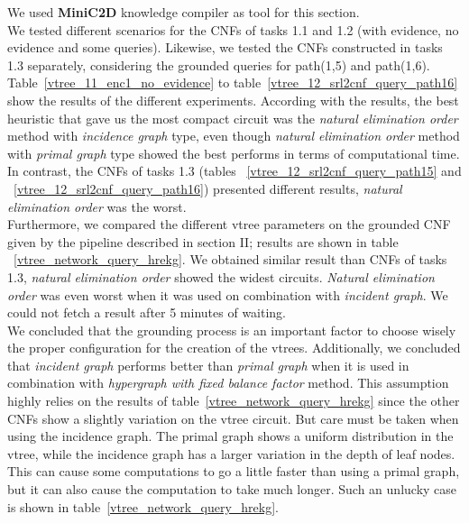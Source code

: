 We used \textbf{MiniC2D} knowledge compiler as tool for this section.
\\[2ex]
We tested different scenarios for the CNFs of tasks 1.1 and 1.2 (with evidence, no evidence and some queries). Likewise, we tested the CNFs constructed in tasks 1.3 separately, considering the grounded queries for path(1,5) and path(1,6).
\\[2ex]
Table~\ref{vtree_11_enc1_no_evidence} to table~\ref{vtree_12_srl2cnf_query_path16} show the results of the different experiments. According with the results, the best heuristic that gave us the most compact circuit was the \textit{natural elimination order} method with \textit{incidence graph} type, even though \textit{natural elimination order} method with \textit{primal graph} type showed the best performs in terms of computational time.
\\[2ex]
In contrast, the CNFs of tasks 1.3 (tables ~\ref{vtree_12_srl2cnf_query_path15} and ~\ref{vtree_12_srl2cnf_query_path16}) presented different results, \textit{natural elimination order} was the worst.
\\[2ex]
Furthermore, we compared the different vtree parameters on the grounded CNF given by the pipeline described in section II; results are shown in table ~\ref{vtree_network_query_hrekg}. We obtained similar result than CNFs of tasks 1.3, \textit{natural elimination order} showed the widest circuits. \textit{Natural elimination order} was even worst when it was used on combination with \textit{incident graph}. We could not fetch a result after 5 minutes of waiting.
\\[2ex]
We concluded that the grounding process is an important factor to choose wisely the proper configuration for the creation of the vtrees. Additionally, we concluded that \textit{incident graph} performs better than \textit{primal graph} when it is used in combination with \textit{hypergraph with fixed balance factor} method. This assumption highly relies on the results of table~\ref{vtree_network_query_hrekg} since the other CNFs show a slightly variation on the vtree circuit. But care must be taken when using the incidence graph.  The primal graph shows a uniform distribution in the vtree, while the incidence graph has a larger variation in the depth of leaf nodes.  This can cause some computations to go a little faster than using a primal graph, but it can also cause the computation to take much longer. Such an unlucky case is shown in table~\ref{vtree_network_query_hrekg}.











